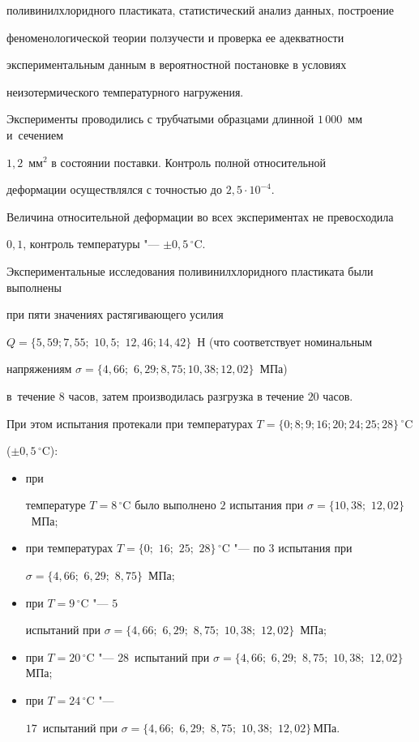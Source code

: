 поливинилхлоридного пластиката, статистический анализ данных, построение

феноменологической теории ползучести и проверка ее адекватности

экспериментальным данным в вероятностной постановке в условиях

неизотермического температурного нагружения.



Эксперименты проводились с трубчатыми образцами длинной $1\,000$~мм и~сечением

$1,2$~мм$^{2}$ в состоянии поставки. Контроль полной относительной

деформации осуществлялся с точностью до $2,5\cdot 10^{-4}$.

Величина относительной деформации во всех экспериментах не превосходила

$0,1$, контроль температуры "--- $\pm 0,5\,^\circ$C.



Экспериментальные исследования поливинилхлоридного пластиката были выполнены

при пяти значениях растягивающего усилия

$Q=\{ 5,59; 7,55;$  $10,5;$ $ 12,46; 14,42 \}$~Н (что соответствует номинальным

напряжениям $\sigma =\{ 4,66;$  $6,29; 8,75; 10,38; 12,02 \}$~МПа)

в~течение $8$ часов, затем производилась разгрузка в течение $20$ часов.

При этом испытания протекали при температурах $T=\{ 0; 8; 9; 16; 20; 24; 25; 28\}\,^\circ$C

($ \pm 0,5\,^\circ$C):

\begin{itemize}

 \item  при

температуре $T=8\,^\circ $C было выполнено $2$ испытания при $\sigma =\{10,38;$ $12,02\}$~МПа;

\item

при температурах \mbox{$T=\{ 0;$} $16;$ $25;$ $28\}\,^\circ$C "--- по $3$ испытания при

$\sigma =\{4,66;$ $6,29;$ $8,75\}$~МПа;

\item  при \mbox{$T=9\,^\circ $C} "--- $5$

испытаний при $\sigma =\{ 4,66;$ $6,29;$ $8,75;$ $10,38;$ $12,02\}$~МПа;

\item  при $T=20\,^\circ $C "--- $28$~испытаний при $\sigma {=}\{ 4,66;$ $6,29;$ $8,75;$ $10,38;$ $12,02\}$\,МПа;

\item при $T=24\,^\circ$C "---

$17$~испытаний при $\sigma {=}\{ 4,66;$ $6,29;$ $8,75;$ $10,38;$ $12,02\}$\,МПа.

\end{itemize}



